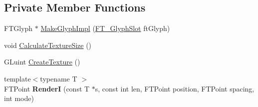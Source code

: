 \subsection*{Private Member Functions}
\begin{DoxyCompactItemize}
\item 
F\+T\+Glyph $\ast$ \hyperlink{class_f_t_texture_font_impl_a1e81ae574487dcccc9526e49d2caf670}{Make\+Glyph\+Impl} (\hyperlink{struct_f_t___glyph_slot_rec__}{F\+T\+\_\+\+Glyph\+Slot} ft\+Glyph)
\item 
void \hyperlink{class_f_t_texture_font_impl_a136617722df1c22fa86e82c7eac081c0}{Calculate\+Texture\+Size} ()
\item 
G\+Luint \hyperlink{class_f_t_texture_font_impl_a91dd7315701b3280d93257c270c3f304}{Create\+Texture} ()
\item 
{\footnotesize template$<$typename T $>$ }\\F\+T\+Point {\bfseries RenderI} (const T $\ast$s, const int len, F\+T\+Point position, F\+T\+Point spacing, int mode)\hypertarget{class_f_t_texture_font_impl_a159161fb10e952314bf3558e96ba8366}{}\label{class_f_t_texture_font_impl_a159161fb10e952314bf3558e96ba8366}

\end{DoxyCompactItemize}
